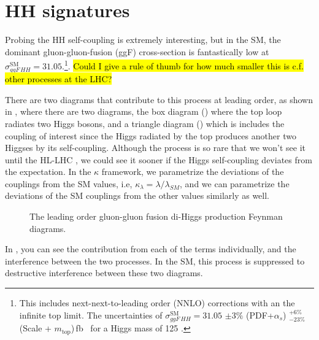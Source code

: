 \section{HH signatures}

Probing the HH self-coupling is extremely interesting, but in the SM, the dominant gluon-gluon-fusion (ggF) cross-section is fantastically low at $\sigma_{ggF\,HH}^{\text{SM}} = 31.05$.\footnote{This includes next-next-to-leading order (NNLO) corrections with an the infinite top limit. The uncertainties  of $\sigma_{ggF\,HH}^{\text{SM}} = 31.05$ $\pm 3\%$ (PDF+$\alpha_{s}$) $^{+ 6\%}_{-23\%}$ (Scale + $m_{\text{top}}$)\,fb~\cite{Grazzini_2018} for a Higgs mass of 125 \GeV.}.
\hl{Could I give a rule of thumb for how much smaller this is c.f. other processes at the LHC?}

There are two diagrams that contribute to this process at leading order, as shown in \Fig{\ref{fig:ggF_feyn_dias}}, where there are two diagrams, the box diagram (\Fig{\ref{fig:ggF_feyn_dias}}) where the top loop radiates two Higgs bosons, and a triangle diagram (\Fig{\ref{fig:ggF_feyn_dias}}) which is includes the coupling of interest since the Higgs radiated by the top produces another two Higgses by its self-coupling. 
Although the process is so rare that we won't see it until the HL-LHC \cite{hh-proj}, we could see it sooner if the Higgs self-coupling deviates from the expectation. In the $\kappa$ framework, we parametrize the deviations of the couplings from the SM values, i.e, $\kappa_\lambda = \lambda / \lambda_{SM}$, and we can parametrize the deviations of the SM couplings from the other values similarly as well.

\begin{figure}[h]
    \centering
    \caption{The leading order gluon-gluon fusion di-Higgs production Feynman diagrams.}
    \label{fig:ggF_feyn_dias}
\end{figure}

In \Fig{\ref{fig:box_tri}}, you can see the contribution from each of the terms individually, and the interference between the two processes.
In the SM, this process is suppressed to destructive interference between these two diagrams.

